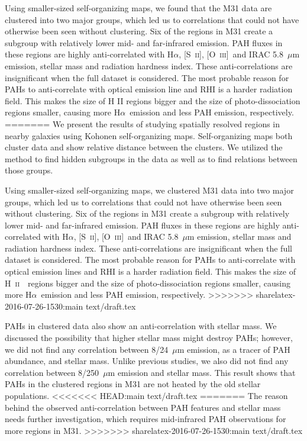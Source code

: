 \documentclass[useAMS,usenatbib]{mn2e}
\newcommand \halpha    {H$\alpha $}
\newcommand \sii {[S~\textsc{ii}]}
\newcommand \oiii {[O~\textsc{iii}]}
\newcommand \hii {H~\textsc{ii}\ }
\begin{document}
Using smaller-sized self-organizing maps, we found that the M31 data are clustered into two major groups, which led us to correlations that could not have otherwise been seen without clustering.
Six of the regions in M31 create a subgroup with relatively lower mid- and far-infrared emission.
PAH fluxes in these regions are highly anti-correlated with \halpha, \sii, \oiii~and IRAC 5.8~$\mu$m emission, stellar mass and radiation hardness index.
These anti-correlations are insignificant when the full dataset is considered.
The most probable reason for PAHs to anti-correlate with optical emission line and RHI is a harder radiation field.
This makes the size of H {\sc II} regions bigger and the size of photo-dissociation regions smaller, causing more \halpha~emission and less PAH emission, respectively.
=======
We present the results of studying spatially resolved regions in nearby galaxies using Kohonen self-organizing maps.
Self-organizing maps both cluster data and show relative distance between the clusters. 
We utilized the method to find hidden subgroups in the data as well as to find relations between those groups.

Using smaller-sized self-organizing maps, we clustered M31 data into two major groups, which led us to correlations that could not have otherwise been seen without clustering.
Six of the regions in M31 create a subgroup with relatively lower mid- and far-infrared emission.
PAH fluxes in these regions are highly anti-correlated with \halpha, \sii, \oiii~and IRAC 5.8~$\mu$m emission, stellar mass and radiation hardness index.
These anti-correlations are insignificant when the full dataset is considered.
The most probable reason for PAHs to anti-correlate with optical emission lines and RHI is a harder radiation field.
This makes the size of \hii~regions bigger and the size of photo-dissociation regions smaller, causing more \halpha~emission and less PAH emission, respectively.
>>>>>>> sharelatex-2016-07-26-1530:main text/draft.tex

PAHs in clustered data also show an anti-correlation with stellar mass.
We discussed the possibility that higher stellar mass might destroy PAHs;
however, we did not find any correlation between 8/24~$\mu$m emission, as a tracer of PAH abundance, and stellar mass.
Unlike previous studies, we also did not find any correlation between 8/250~$\mu$m emission and stellar mass. 
This result shows that PAHs in the clustered regions in M31 are not heated by the old stellar populations.
<<<<<<< HEAD:main text/draft.tex
=======
The reason behind the observed anti-correlation between PAH features and stellar mass needs further investigation, which requires mid-infrared PAH observations for more regions in M31. 
>>>>>>> sharelatex-2016-07-26-1530:main text/draft.tex
\end{document}
